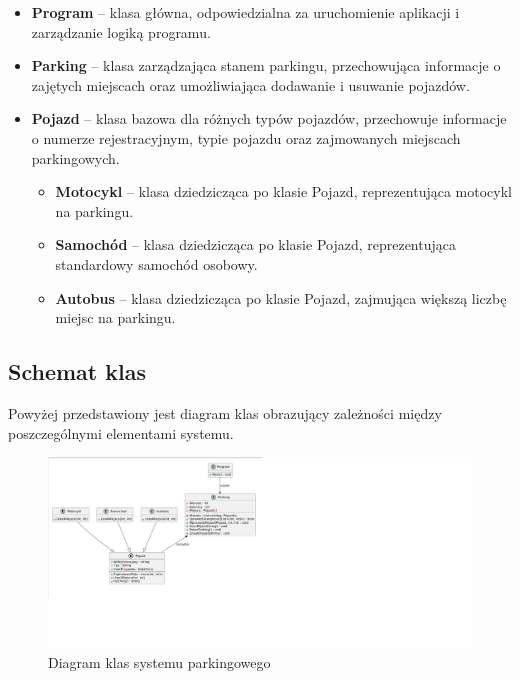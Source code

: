 \begin{itemize}
    \item \textbf{Program} – klasa główna, odpowiedzialna za uruchomienie aplikacji i zarządzanie logiką programu.
    \item \textbf{Parking} – klasa zarządzająca stanem parkingu, przechowująca informacje o zajętych miejscach oraz umożliwiająca dodawanie i usuwanie pojazdów.
    \item \textbf{Pojazd} – klasa bazowa dla różnych typów pojazdów, przechowuje informacje o numerze rejestracyjnym, typie pojazdu oraz zajmowanych miejscach parkingowych.
    \begin{itemize}
        \item \textbf{Motocykl} – klasa dziedzicząca po klasie Pojazd, reprezentująca motocykl na parkingu.
        \item \textbf{Samochód} – klasa dziedzicząca po klasie Pojazd, reprezentująca standardowy samochód osobowy.
        \item \textbf{Autobus} – klasa dziedzicząca po klasie Pojazd, zajmująca większą liczbę miejsc na parkingu.
    \end{itemize}
\end{itemize}

\subsection{Schemat klas}
Powyżej przedstawiony jest diagram klas obrazujący zależności między poszczególnymi elementami systemu.

\begin{figure}[]
    \centering
    \includegraphics[width=\textwidth]{diagram_klas2.jpg}
    \caption{Diagram klas systemu parkingowego}
    \label{fig:diagram_klas}
\end{figure}






